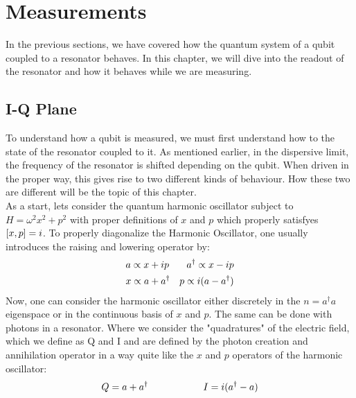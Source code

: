 \chapter{Measurements}
In the previous sections, we have covered how the quantum system of a qubit coupled to a resonator behaves. In this chapter, we will dive into the readout of the resonator and how it behaves while we are measuring.

\section{I-Q Plane}
To understand how a qubit is measured, we must first understand how to the state of the resonator coupled to it. As mentioned earlier, in the dispersive limit, the frequency of the resonator is shifted depending on the qubit. When driven in the proper way, this gives rise to two different kinds of behaviour. How these two are different will be the topic of this chapter. \\

As a start, lets consider the quantum harmonic oscillator subject to $H = \omega^2  x^2 + p^2$ with proper definitions of $x$ and $p$ which properly satisfyes $\comm{x}{p} = i$. To properly diagonalize the Harmonic Oscillator, one usually introduces the raising and lowering operator by:
\begin{align}
    &a \propto x + ip \hfill &a^\dagger \propto x - ip \\
    &x \propto a + a^\dagger \hfill &p\propto i (a - a^\dagger)
\end{align}
Now, one can consider the harmonic oscillator either discretely in the $n = a^\dagger a$ eigenspace or in the continuous basis of $x$ and $p$. The same can be done with photons in a resonator. Where we consider the "quadratures" of the electric field, which we define as Q and I and are defined by the photon creation and annihilation operator in a way quite like the $x$ and $p$ operators of the harmonic oscillator:
\begin{equation}
    Q = a + a^\dagger \hspace{2 cm} I = i(a^\dagger - a)
\end{equation}

